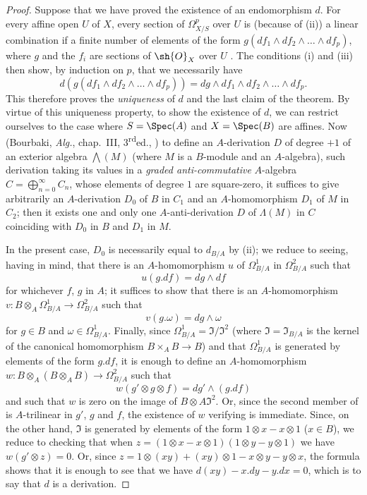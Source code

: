 \begin{proof}
Suppose that we have proved the existence of an endomorphism $d$.
For every affine open $U$ of $X$, every section of $\Omega_{X/S}^p$ over $U$ is (because of \rm{(ii)}) a linear combination if a finite number of elements of the form $g(df_1 \wedge df_2 \wedge \dots \wedge df_p)$, where $g$ and the $f_i$ are sections of $\sh{O}_X$ over $U$ .
The conditions \rm{(i)} and \rm{(iii)} then show, by induction on $p$, that we necessarily have
\[
  \label{IV.16.6.2.2}
  d(g(df_1 \wedge df_2 \wedge \dots \wedge df_p)) = dg \wedge df_1 \wedge df_2 \wedge \dots \wedge df_p.
  \tag{16.6.2.2}
\]
This therefore proves the \emph{uniqueness} of $d$ and the last claim of the theorem.
By virtue of this uniqueness property, to show the existence of $d$, we can restrict ourselves to the case where $S = \Spec(A)$ and $X = \Spec(B)$ are affines.
Now (Bourbaki, \emph{Alg.}, chap.~III, 3\textsuperscript{rd}ed., ) to define an $A$-derivation $D$ of degree $+1$ of an exterior algebra $\bigwedge(M)$ (where $M$ is a $B$-module and an $A$-algebra), such derivation taking its values in a \emph{graded anti-commutative} $A$-algebra $C = \bigoplus_{n=0}^\infty C_n$, whose elements of degree $1$ are square-zero, it suffices to give arbitrarily an $A$-derivation  $D_0$ of $B$ in $C_1$ and an $A$-homomorphism $D_1$ of $M$ in $C_2$;
then it exists one and only one $A$-anti-derivation $D$ of $\Lambda(M)$ in $C$ coinciding with $D_0$ in $B$ and $D_1$ in $M$. 

In the present case, $D_0$ is necessarily equal to $d_{B/A}$ by \rm{(ii)};
we reduce to seeing, having  in mind, that there is an $A$-homomorphism $u$ of $\Omega_{B/A}^1$ in $\Omega_{B/A}^2$ such that 
\[
  \label{IV.16.6.2.3}
  u(g.df) = dg \wedge df
  \tag{16.6.2.3}
\]
for whichever $f$, $g$ in $A$;
it suffices to show that there is an $A$-homomorphism $v:B \otimes_A \Omega_{B/A}^1 \to \Omega_{B/A}^2$ such that
\[
  \label{IV.16.6.2.4}
  v(g.\omega) = dg \wedge \omega
  \tag{16.6.2.4}
\]
for $g \in B$ and $\omega \in \Omega_{B/A}^1$.
Finally, since $\Omega_{B/A}^1 = \mathfrak{I}/\mathfrak{I}^2$ (where $\mathfrak{I} = \mathfrak{I}_{B/A}$ is the kernel of the canonical homomorphism $B \times_A B \to B$) and that $\Omega_{B/A}^1$ is generated by elements of the form $g.df$, it is enough to define an $A$-homomorphism $w: B \otimes_A ( B \otimes_A B ) \to \Omega_{B/A}^2$ such that
\[
  \label{IV.16.6.2.5}
  w(g' \otimes g \otimes f) = dg' \wedge (g.df)
  \tag{16.6.2.5}
\]
and such that $w$ is zero on the image of $B \otimes A \mathfrak{I}^2$.
Or, since the second member of  is $A$-trilinear in $g'$, $g$ and $f$, the existence of $w$ verifying  is immediate.
Since, on the other hand, $\mathfrak{I}$ is generated by elements of the form $1 \otimes x - x \otimes 1$ ($x \in B$), we reduce to checking that when $z = (1 \otimes x - x \otimes 1)(1 \otimes y - y \otimes 1)$ we have $w(g'\otimes z) = 0$. 
Or, since $z = 1 \otimes (xy) + (xy) \otimes 1 - x \otimes y - y \otimes x$, the formula  shows that it is 
enough to see that we have $d(xy) - x.dy - y.dx = 0$, which is to say that $d$ is a derivation.


\end{proof}
